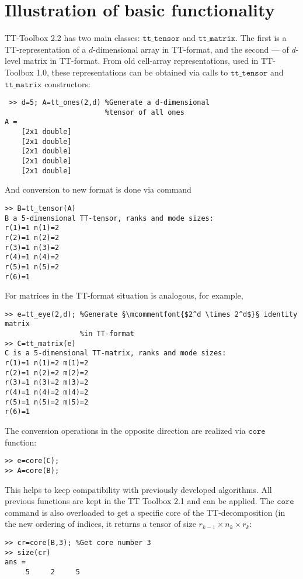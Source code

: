 \documentclass[a4paper,12pt,twoside]{article}
\def\tt{\texttt{tt\_tensor}}
\def\ttm{\texttt{tt\_matrix}}
\begin{document}
\section{Illustration of basic functionality}

TT-Toolbox 2.2 has two main classes: $\tt$ and $\ttm$. 
The first is a TT-representation of a $d$-dimensional array in TT-format, and the second --- of $d$-level 
matrix in TT-format. From  old cell-array representations, used in TT-Toolbox 1.0, 
these representations can be obtained via calls to $\tt$ and $\ttm$ constructors:


%

\begin{lstlisting}
 >> d=5; A=tt_ones(2,d) %Generate a d-dimensional 
                        %tensor of all ones
A = 
    [2x1 double]
    [2x1 double]
    [2x1 double]
    [2x1 double]
    [2x1 double]
\end{lstlisting}
And conversion to new format is done via command
\begin{lstlisting}
>> B=tt_tensor(A)
B a 5-dimensional TT-tensor, ranks and mode sizes: 
r(1)=1 n(1)=2
r(2)=1 n(2)=2
r(3)=1 n(3)=2
r(4)=1 n(4)=2
r(5)=1 n(5)=2
r(6)=1   
\end{lstlisting}
For matrices in the TT-format situation is analogous, for example,
\begin{lstlisting}
>> e=tt_eye(2,d); %Generate §\mcommentfont{$2^d \times 2^d$}§ identity matrix 
                  %in TT-format
>> C=tt_matrix(e)
C is a 5-dimensional TT-matrix, ranks and mode sizes: 
r(1)=1 n(1)=2 m(1)=2
r(2)=1 n(2)=2 m(2)=2
r(3)=1 n(3)=2 m(3)=2
r(4)=1 n(4)=2 m(4)=2
r(5)=1 n(5)=2 m(5)=2
r(6)=1     
\end{lstlisting}

The conversion operations in the opposite direction are realized via $\texttt{core}$ function:
\begin{lstlisting}
>> e=core(C); 
>> A=core(B);
\end{lstlisting}
This helps to keep compatibility with previously developed algorithms. All previous functions
are kept in the TT Toolbox 2.1 and can be applied. The $\texttt{core}$ command is also overloaded
to get a specific core of the TT-decomposition (in the new ordering of indices, it returns a tensor of
size $r_{k-1} \times n_k \times r_k$:
\begin{lstlisting}
>> cr=core(B,3); %Get core number 3
>> size(cr)
ans =
     5     2     5
\end{lstlisting} 
\end{document}
